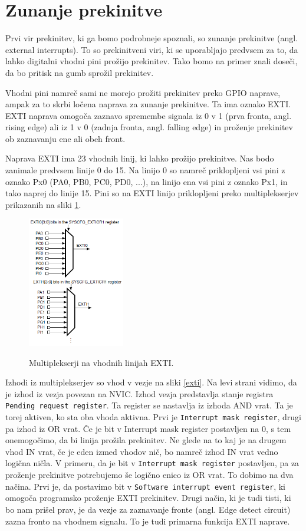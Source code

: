 \documentclass[12pt,letterpaper]{article}
\begin{document}
\section*{Zunanje prekinitve}

Prvi vir prekinitev, ki ga bomo podrobneje spoznali, so zunanje prekinitve (angl. external interrupts). To so prekinitveni viri, ki se uporabljajo predvsem za to, da lahko digitalni vhodni pini prožijo prekinitev. Tako bomo na primer znali doseči, da bo pritisk na gumb sprožil prekinitev.

Vhodni pini namreč sami ne morejo prožiti prekinitev preko GPIO naprave, ampak za to skrbi ločena naprava za zunanje prekinitve. Ta ima oznako EXTI. EXTI naprava omogoča zaznavo spremembe signala iz 0 v 1 (prva fronta, angl. rising edge) ali iz 1 v 0 (zadnja fronta, angl. falling edge) in proženje prekinitev ob zaznavanju ene ali obeh front.

Naprava EXTI ima 23 vhodnih linij, ki lahko prožijo prekinitve. Nas bodo zanimale predvsem linije 0 do 15. Na linijo 0 so namreč priklopljeni vsi pini z oznako Px0 (PA0, PB0, PC0, PD0, ...), na linijo ena vsi pini z oznako Px1, in tako naprej do linije 15. Pini so na EXTI linijo priklopljeni preko multiplekserjev prikazanih na sliki \ref{EXTImux}.

\begin{figure}[ht!]
  \centering
  \caption{Multiplekserji na vhodnih linijah EXTI.}
  \includegraphics[width=120pt]{images/vaja6/mux.png}
  \label{EXTImux}
\end{figure}

Izhodi iz multiplekserjev so vhod v vezje na sliki \ref{exti}. Na levi strani vidimo, da je izhod iz vezja povezan na NVIC. Izhod vezja predstavlja stanje registra \texttt{Pending request register}. Ta register se nastavlja iz izhoda AND vrat. Ta je torej aktiven, ko sta oba vhoda aktivna. Prvi je \texttt{Interrupt mask register}, drugi pa izhod iz OR vrat. Če je bit v Interrupt mask register postavljen na 0, s tem onemogočimo, da bi linija prožila prekinitev. Ne glede na to kaj je na drugem vhod IN vrat, če je eden izmed vhodov nič, bo namreč izhod IN vrat vedno logična ničla. V primeru, da je bit v \texttt{Interrupt mask register} postavljen, pa za proženje prekinitve potrebujemo še logično enico iz OR vrat. To dobimo na dva načina. Prvi je, da postavimo bit v \texttt{Software interrupt event register}, ki omogoča programsko proženje EXTI prekinitev. Drugi način, ki je tudi tisti, ki bo nam prišel prav, je da vezje za zaznavanje fronte (angl. Edge detect circuit) zazna fronto na vhodnem signalu. To je tudi primarna funkcija EXTI naprave.
\end{document}
